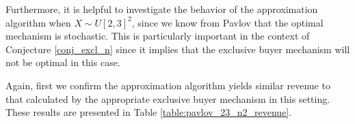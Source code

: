 \documentclass{article}
\newcounter{fig}
\begin{document}





  

Furthermore, it is helpful to investigate the behavior of the approximation algorithm when $X \sim U[2,3]^2$, since we know from Pavlov \autocite*{pavlov2011optimal} that the optimal mechanism is stochastic. This is particularly important in the context of Conjecture \ref{conj_excl_n} since it implies that the exclusive buyer mechanism will not be optimal in this case.

Again, first we confirm the approximation algorithm yields similar revenue to that calculated by the appropriate exclusive buyer mechanism in this setting. These results are presented in Table \ref{table:pavlov_23_n2_revenue}.
\end{document}
